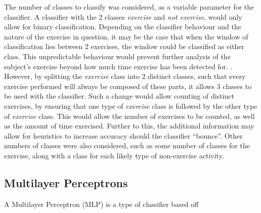 \label{ml}


	


The number of classes to classify was considered, as a variable parameter for the classifier. A classifier with the 2 classes \textit{exercise}  and \textit{not exercise}, would only allow for binary classification. Depending on the classifier behaviour and the nature of the exercise in question, it may be the case that when the window of classification lies between 2 exercises, the window could be classified as either class. This unpredictable behaviour would prevent further analysis of the subject's exercise beyond how much time exercise has been detected for. . However, by splitting the \textit{exercise} class into 2 distinct classes, such that every exercise performed will always be composed of these parts, it allows 3 classes to be used with the classifier. Such a change would allow counting of distinct exercises, by ensuring that one type of \textit{exercise} class is followed by the other type of \textit{exercise} class. This would allow the number of exercises to be counted, as well as the amount of time exercised. Further to this, the additional information may allow for heuristics to increase accuracy should the classifier ``bounce''.  Other numbers of classes were also considered, such as some number of classes for the exercise, along with a class for each likely type of non-exercise activity. 


\subsection{Multilayer Perceptrons}
A Multilayer Perceptron (MLP) is a type of classifier based off 


